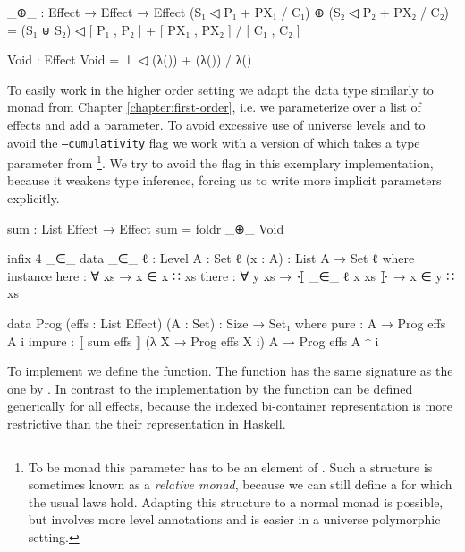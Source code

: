 \begin{code}
_⊕_ : Effect → Effect → Effect
(S₁ ◁ P₁ + PX₁ / C₁) ⊕ (S₂ ◁ P₂ + PX₂ / C₂) =
  (S₁ ⊎ S₂) ◁ [ P₁ , P₂ ] + [ PX₁ , PX₂ ] / [ C₁ , C₂ ]

Void : Effect
Void = ⊥ ◁ (λ()) + (λ()) / λ()
\end{code}
To easily work in the higher order setting we adapt the 
data type similarly to  monad from Chapter
\ref{chapter:first-order}, i.e. we parameterize over a list of effects and add a
 parameter.
To avoid excessive use of universe levels and to avoid the \texttt{--cumulativity}
flag we work with a version of  which takes a type parameter
from \footnote{To be monad this parameter has to be an element
  of . Such a structure is sometimes known as a \textit{relative
  monad}, because we can still define a \AgdaFunction{>>=} for which the usual
  laws hold. Adapting this structure to a normal monad is possible, but involves
  more level annotations and is easier in a universe polymorphic setting.}.
We try to avoid the flag in this exemplary implementation, because it weakens
type inference, forcing us to write more implicit parameters explicitly.

\begin{code}[hide]
sum : List Effect → Effect
sum = foldr _⊕_ Void

infix 4 _∈_
data _∈_ {ℓ : Level} {A : Set ℓ} (x : A) : List A → Set ℓ where
  instance
    here   : ∀ {xs} → x ∈ x ∷ xs
    there  : ∀ {y xs} → ⦃ _∈_ {ℓ} x xs ⦄ → x ∈ y ∷ xs
\end{code}
\begin{code}
data Prog (effs : List Effect) (A : Set) : {Size} → Set₁ where
  pure    : A → Prog effs A {i}
  impure  : ⟦ sum effs ⟧ (λ X → Prog effs X {i}) A → Prog effs A {↑ i}
\end{code}
To implement \AgdaFunction{>>=} we define the  function.
The function has the same signature as the one by
\textcite{DBLP:conf/haskell/WuSH14}.
In contrast to the implementation by \textcite{DBLP:conf/haskell/WuSH14} the
function can be defined generically for all effects, because the indexed
bi-container representation is more restrictive than the their representation in
Haskell.

